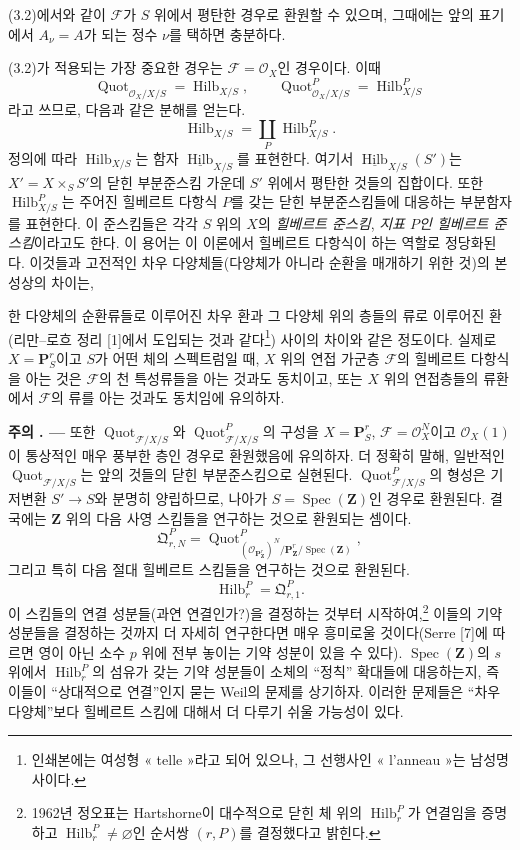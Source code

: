 \documentclass[11pt,twoside,openany]{book}
\numberwithin{equation}{section}
\newcommand{\sourceunit}{front}
\newcommand{\src}[1]{%
  \phantomsection\hypertarget{src:\sourceunit:#1}{}%
  \marginpar{\raggedleft\footnotesize\sffamily #1}%
}
\theoremstyle{plain}
\theoremstyle{definition}
\theoremstyle{remark}
\newcommand{\result}[2]{%
  \par\medskip\noindent\textbf{#1%
  \if\relax\detokenize{#2}\relax\else\space#2\fi. ---}\enspace
}
\begin{document}
(3.2)에서와 같이 $\mathcal F$가 $S$ 위에서 평탄한 경우로 환원할 수
있으며, 그때에는 앞의 표기에서 $A_\nu=A$가 되는 정수 $\nu$를 택하면
충분하다.

(3.2)가 적용되는 가장 중요한 경우는 $\mathcal F=\mathcal O_X$인
경우이다. 이때
\[
\operatorname{Quot}_{\mathcal O_X/X/S}=\operatorname{Hilb}_{X/S},
\qquad
\operatorname{Quot}^P_{\mathcal O_X/X/S}=\operatorname{Hilb}^P_{X/S}
\]
라고 쓰므로, 다음과 같은 분해를 얻는다.
\[
\operatorname{Hilb}_{X/S}=\coprod_P\operatorname{Hilb}^P_{X/S}.
\]
정의에 따라 $\operatorname{Hilb}_{X/S}$는 함자
$\underline{\operatorname{Hilb}}_{X/S}$를 표현한다. 여기서
$\underline{\operatorname{Hilb}}_{X/S}(S')$는
$X'=X\times_SS'$의 닫힌 부분준스킴 가운데 $S'$ 위에서 평탄한 것들의
집합이다. 또한 $\operatorname{Hilb}^P_{X/S}$는 주어진 힐베르트
다항식 $P$를 갖는 닫힌 부분준스킴들에 대응하는 부분함자를 표현한다.
이 준스킴들은 각각 $S$ 위의 $X$의 \emph{힐베르트 준스킴},
\emph{지표 $P$인 힐베르트 준스킴}이라고도 한다. 이 용어는 이 이론에서
힐베르트 다항식이 하는 역할로 정당화된다. 이것들과 고전적인 차우
다양체들(다양체가 아니라 순환을 매개하기 위한 것)의 본성상의 차이는,
\src{266}
한 다양체의 순환류들로 이루어진 차우 환과 그 다양체 위의 층들의 류로
이루어진 환(리만--로흐 정리 [1]에서 도입되는 것과
같다\footnote{인쇄본에는 여성형 « telle »라고 되어
있으나, 그 선행사인 « l'anneau »는 남성명사이다.}) 사이의 차이와 같은
정도이다. 실제로 $X=\mathbf P^r_S$이고 $S$가 어떤 체의 스펙트럼일 때,
$X$ 위의 연접 가군층 $\mathcal F$의 힐베르트 다항식을 아는 것은
$\mathcal F$의 천 특성류들을 아는 것과도 동치이고, 또는 $X$ 위의 연접층들의
류환에서 $\mathcal F$의 류를 아는 것과도 동치임에 유의하자.

\result{주의}{3.9} 또한 $\operatorname{Quot}_{\mathcal F/X/S}$와
$\operatorname{Quot}^P_{\mathcal F/X/S}$의 구성을
$X=\mathbf P^r_S$, $\mathcal F=\mathcal O_X^N$이고
$\mathcal O_X(1)$이 통상적인 매우 풍부한 층인 경우로 환원했음에
유의하자. 더 정확히 말해, 일반적인
$\operatorname{Quot}_{\mathcal F/X/S}$는 앞의 것들의 닫힌
부분준스킴으로 실현된다. $\operatorname{Quot}^P_{\mathcal F/X/S}$의
형성은 기저변환 $S'\longrightarrow S$와 분명히 양립하므로, 나아가
$S=\operatorname{Spec}(\mathbf Z)$인 경우로 환원된다. 결국에는
$\mathbf Z$ 위의 다음 사영 스킴들을 연구하는 것으로 환원되는 셈이다.
\[
\mathfrak Q^P_{r,N}=
\operatorname{Quot}^{P}_{(\mathcal O_{\mathbf P^r_{\mathbf Z}})^N/
\mathbf P^r_{\mathbf Z}/\operatorname{Spec}(\mathbf Z)},
\]
그리고 특히 다음 절대 힐베르트 스킴들을 연구하는 것으로 환원된다.
\[
\operatorname{Hilb}^P_r=\mathfrak Q^P_{r,1}.
\]
이 스킴들의 연결 성분들(과연 연결인가?)을 결정하는 것부터
시작하여,\footnote{1962년 정오표는 Hartshorne이 대수적으로 닫힌 체 위의
$\operatorname{Hilb}^P_r$가 연결임을 증명하고
$\operatorname{Hilb}^P_r\neq\varnothing$인 순서쌍 $(r,P)$를 결정했다고
밝힌다.} 이들의 기약 성분들을 결정하는 것까지 더 자세히 연구한다면 매우
흥미로울 것이다(Serre [7]에 따르면 영이 아닌 소수 $p$ 위에 전부 놓이는
기약 성분이 있을 수 있다). $\operatorname{Spec}(\mathbf Z)$의
$s$ 위에서 $\operatorname{Hilb}^P_r$의 섬유가 갖는 기약 성분들이
소체의 ``정칙'' 확대들에 대응하는지, 즉 이들이 ``상대적으로 연결''인지
묻는 Weil의 문제를 상기하자. 이러한 문제들은 ``차우 다양체''보다
힐베르트 스킴에 대해서 더 다루기 쉬울 가능성이 있다.
\end{document}
